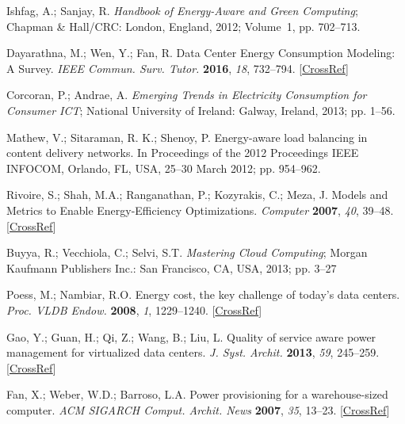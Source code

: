 \begin{thebibliography}{999}
	
	Ishfag, A.; Sanjay, R. \textit{Handbook of Energy-Aware and Green Computing}; Chapman \& Hall/CRC: London, England, 2012; Volume~1, pp. 702--713.
	
	Dayarathna, M.; Wen, Y.; Fan, R. Data Center Energy Consumption Modeling: A Survey. {\em IEEE Commun. Surv. Tutor.} {\bf 2016}, {\em 18}, 732--794. [\href{http://doi.org/10.1109/COMST.2015.2481183}{CrossRef}]
	
	Corcoran, P.; Andrae, A. \emph{Emerging Trends in Electricity Consumption for Consumer ICT}; National University of Ireland: Galway, Ireland, 2013; pp. 1--56.
	
	Mathew, V.; Sitaraman, R. K.; Shenoy, P. Energy-aware load balancing in content delivery networks. {In Proceedings of the 2012 Proceedings IEEE INFOCOM, Orlando, FL, USA, 25--30 March 2012}; pp. 954--962.
	
	Rivoire, S.; Shah, M.A.; Ranganathan, P.; Kozyrakis, C.; Meza, J. Models and Metrics to Enable Energy-Efficiency Optimizations. {\em Computer} {\bf 2007}, {\em 40}, 39--48. [\href{http://dx.doi.org/10.1109/MC.2007.436}{CrossRef}]
	
	Buyya, R.; Vecchiola, C.; Selvi, S.T. \textit{Mastering Cloud Computing}; Morgan Kaufmann Publishers Inc.: San Francisco, CA, USA, 2013; pp. 3--27
	
	Poess, M.; Nambiar, R.O. Energy cost, the key challenge of today's data centers. {\em Proc. VLDB Endow.} {\bf 2008}, {\em 1}, 1229--1240. [\href{http://dx.doi.org/10.14778/1454159.1454162}{CrossRef}]
	
	Gao, Y.; Guan, H.; Qi, Z.; Wang, B.; Liu, L. Quality of service aware power management for virtualized data centers. {\em J. Syst. Archit.} {\bf 2013}, {\em 59}, 245--259. [\href{http://dx.doi.org/10.1016/j.sysarc.2013.03.007}{CrossRef}]
	
	Fan, X.; Weber, W.D.; Barroso, L.A. Power provisioning for a warehouse-sized computer. {\em ACM SIGARCH Comput. Archit. News} {\bf 2007}, {\em 35}, 13--23. [\href{http://dx.doi.org/10.1145/1273440.1250665}{CrossRef}]
	

\end{thebibliography}

